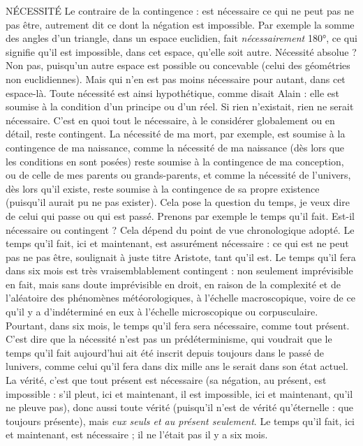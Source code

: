 NÉCESSITÉ Le contraire de la contingence : est nécessaire ce qui ne peut
pas ne pas être, autrement dit ce dont la négation est impossible. 
Par exemple la somme des angles d’un triangle, dans un espace euclidien,
fait {\it nécessairement} 180°, ce qui signifie qu’il est impossible, dans cet espace,
qu’elle soit autre. Nécessité absolue ? Non pas, puisqu’un autre espace est possible
ou concevable (celui des géométries non euclidiennes). Mais qui n’en est
pas moins nécessaire pour autant, dans cet espace-là. Toute nécessité est ainsi
hypothétique, comme disait Alain : elle est soumise à la condition d’un principe
ou d’un réel. Si rien n’existait, rien ne serait nécessaire. C’est en quoi tout
le nécessaire, à le considérer globalement ou en détail, reste contingent. La
nécessité de ma mort, par exemple, est soumise à la contingence de ma naissance,
comme la nécessité de ma naissance (dès lors que les conditions en sont
posées) reste soumise à la contingence de ma conception, ou de celle de mes
parents ou grands-parents, et comme la nécessité de l’univers, dès lors qu’il
existe, reste soumise à la contingence de sa propre existence (puisqu'il aurait pu
ne pas exister). Cela pose la question du temps, je veux dire de celui qui passe
ou qui est passé. Prenons par exemple le temps qu’il fait. Est-il nécessaire ou
contingent ? Cela dépend du point de vue chronologique adopté. Le temps
qu’il fait, ici et maintenant, est assurément nécessaire : ce qui est ne peut pas ne
pas être, soulignait à juste titre Aristote, tant qu’il est. Le temps qu’il fera dans
six mois est très vraisemblablement contingent : non seulement imprévisible en
fait, mais sans doute imprévisible en droit, en raison de la complexité et de
l’aléatoire des phénomènes météorologiques, à l’échelle macroscopique, voire
de ce qu’il y a d’indéterminé en eux à l’échelle microscopique ou corpusculaire.
Pourtant, dans six mois, le temps qu’il fera sera nécessaire, comme tout présent.
C’est dire que la nécessité n’est pas un prédéterminisme, qui voudrait que le
temps qu’il fait aujourd’hui ait été inscrit depuis toujours dans le passé de lunivers,
comme celui qu’il fera dans dix mille ans le serait dans son état actuel. La
vérité, c'est que tout présent est nécessaire (sa négation, au présent, est
impossible : s’il pleut, ici et maintenant, il est impossible, ici et maintenant,
qu'il ne pleuve pas), donc aussi toute vérité (puisqu'il n’est de vérité
qu'éternelle : que toujours présente), mais {\it eux seuls et au présent seulement}. Le
temps qu’il fait, ici et maintenant, est nécessaire ; il ne l’était pas il y a six mois.
